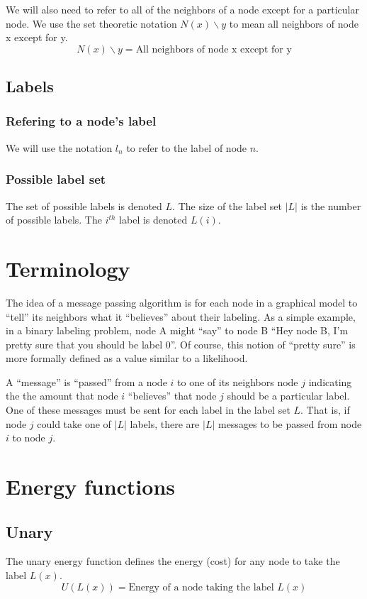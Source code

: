 \documentclass[a4paper,10pt]{article}
\begin{document}
We will also need to refer to all of the neighbors of a node except for a particular node. We use the set theoretic notation $N(x)\backslash y$ to mean all neighbors of node x except for y.
\begin{equation}
N(x)\backslash y = \mbox{All neighbors of node x except for y}
\end{equation}

\subsection{Labels}
\subsubsection{Refering to a node's label}
We will use the notation $l_n$ to refer to the label of node $n$.

\subsubsection{Possible label set}
The set of possible labels is denoted $L$. The size of the label set $|L|$ is the number of possible labels. The $i^{th}$ label is denoted $L(i)$.


\section{Terminology}
The idea of a message passing algorithm is for each node in a graphical model to ``tell'' its neighbors what it ``believes'' about their labeling. As a simple example, in a binary labeling problem, node A might ``say'' to node B ``Hey node B, I'm pretty sure that you should be label 0''. Of course, this notion of ``pretty sure'' is more formally defined as a value similar to a likelihood.

A ``message'' is ``passed'' from a node $i$ to one of its neighbors node $j$ indicating the the amount that node $i$ ``believes'' that node $j$ should be a particular label. One of these messages must be sent for each label in the label set $L$. That is, if node $j$ could take one of $|L|$ labels, there are $|L|$ messages to be passed from node $i$ to node $j$.

\section{Energy functions}
\label{sec:EnergyFunctions}
\subsection{Unary}
\label{sec:EnergyFunctions:Unary}
The unary energy function defines the energy (cost) for any node to take the label $L(x)$.
\begin{equation}
 U(L(x)) = \mbox{Energy of a node taking the label } L(x)
\end{equation}
\end{document}
